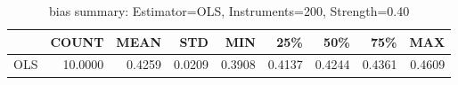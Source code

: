 \begin{table}[ht]
\centering
\caption{bias summary: Estimator=OLS, Instruments=200, Strength=0.40}
\begin{tabular}{lrrrrrrrr}
\toprule
 & COUNT & MEAN & STD & MIN & 25\% & 50\% & 75\% & MAX \\
\midrule
OLS & 10.0000 & 0.4259 & 0.0209 & 0.3908 & 0.4137 & 0.4244 & 0.4361 & 0.4609 \\
\bottomrule
\end{tabular}
\end{table}

